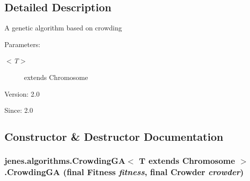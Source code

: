 \subsection{Detailed Description}
A genetic algorithm based on crowding

\begin{Desc}
\item[Parameters:]
\begin{description}
\item[{\em $<$T$>$}]extends Chromosome\end{description}
\end{Desc}
\begin{Desc}
\item[Version:]2.0 \end{Desc}
\begin{Desc}
\item[Since:]2.0 \end{Desc}


\subsection{Constructor \& Destructor Documentation}
\hypertarget{classjenes_1_1algorithms_1_1_crowding_g_a_3_01_t_01extends_01_chromosome_01_4_5f9de70a8e431de7e0f9bbb6bb42ec1e}{
\subsubsection[CrowdingGA]{\setlength{\rightskip}{0pt plus 5cm}jenes.algorithms.CrowdingGA$<$ T extends Chromosome $>$.CrowdingGA (final Fitness {\em fitness}, \/  final Crowder {\em crowder})}}
\label{classjenes_1_1algorithms_1_1_crowding_g_a_3_01_t_01extends_01_chromosome_01_4_5f9de70a8e431de7e0f9bbb6bb42ec1e}


